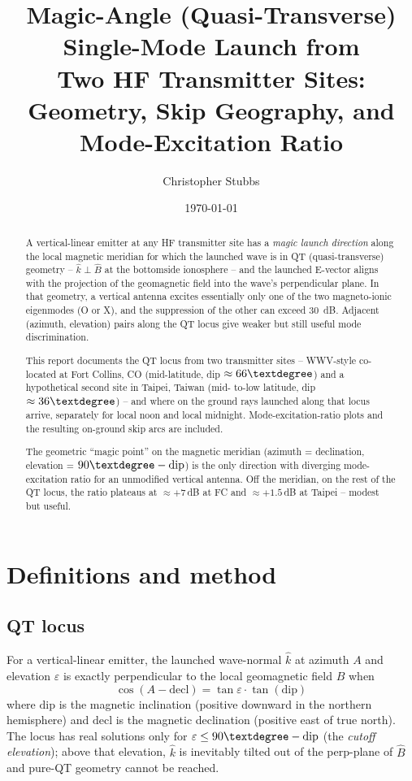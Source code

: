 \documentclass[11pt]{article}
\title{Magic-Angle (Quasi-Transverse) Single-Mode Launch from \\
       Two HF Transmitter Sites:\\
       \large Geometry, Skip Geography, and Mode-Excitation Ratio}
\author{Christopher Stubbs}
\date{\today}
\begin{document}
\maketitle

\begin{abstract}
A vertical-linear emitter at any HF transmitter site has a
\emph{magic launch direction} along the local magnetic meridian for
which the launched wave is in QT (quasi-transverse) geometry --
$\hat{k} \perp \hat{B}$ at the bottomside ionosphere -- and the
launched E-vector aligns with the projection of the geomagnetic field
into the wave's perpendicular plane.  In that geometry, a vertical
antenna excites essentially only one of the two magneto-ionic
eigenmodes (O or X), and the suppression of the other can exceed
30~dB.  Adjacent (azimuth, elevation) pairs along the QT locus give
weaker but still useful mode discrimination.

This report documents the QT locus from two transmitter sites --
WWV-style co-located at Fort Collins, CO (mid-latitude, dip $\approx
66\textdegree$) and a hypothetical second site in Taipei, Taiwan (mid-
to-low latitude, dip $\approx 36\textdegree$) -- and where on the
ground rays launched along that locus arrive, separately for local
noon and local midnight.  Mode-excitation-ratio plots and the
resulting on-ground skip arcs are included.

The geometric ``magic point'' on the magnetic meridian (azimuth =
declination, elevation = $90\textdegree-\text{dip}$) is the only
direction with diverging mode-excitation ratio for an unmodified
vertical antenna.  Off the meridian, on the rest of the QT locus, the
ratio plateaus at $\approx +7\,$dB at FC and $\approx +1.5\,$dB at
Taipei -- modest but useful.
\end{abstract}


\section{Definitions and method}

\subsection*{QT locus}

For a vertical-linear emitter, the launched wave-normal $\hat{k}$ at
azimuth $A$ and elevation $\varepsilon$ is exactly perpendicular to
the local geomagnetic field $\hat{B}$ when
\begin{equation}
  \cos(A - \mathrm{decl}) = \tan\varepsilon \cdot \tan(\mathrm{dip})
  \label{eq:qt}
\end{equation}
where $\mathrm{dip}$ is the magnetic inclination (positive downward
in the northern hemisphere) and $\mathrm{decl}$ is the magnetic
declination (positive east of true north).  The locus has real
solutions only for $\varepsilon \le 90\textdegree - \mathrm{dip}$
(the \emph{cutoff elevation}); above that elevation, $\hat{k}$ is
inevitably tilted out of the perp-plane of $\hat{B}$ and pure-QT
geometry cannot be reached.
\end{document}
